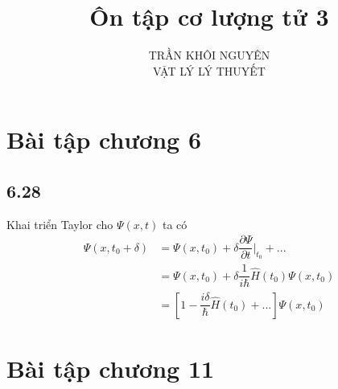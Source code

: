 \documentclass{article}
\title{\Huge{Ôn tập cơ lượng tử 3}}
\newcommand{\f}[2]{\dfrac{#1}{#2}}
\newcommand{\at}[2]{\bigg\rvert_{#1}^{#2} }
\begin{document}
\setlength{\parindent}{20pt}
\newpage
\author{TRẦN KHÔI NGUYÊN \\ VẬT LÝ LÝ THUYẾT}
\maketitle
\section{Bài tập chương 6}	
\subsection*{6.28}
Khai triển Taylor cho $\Psi(x,t)$ ta có
\begin{equation*}
	\begin{aligned}
		\Psi(x,t_{0} + \delta) 
		&= \Psi(x,t_{0}) + \delta \f{\partial \Psi}{\partial t} \at{t_{0}}{} + ... \\
		&= \Psi(x, t_{0}) + \delta \f{1}{i \hbar} \hat{H}(t_{0}) \Psi(x,t_{0})\\
		&= \left[ 1 - \f{i \delta}{\hbar} \hat{H}(t_{0}) + ... \right] \Psi(x,t_{0})
	\end{aligned}
\end{equation*}	
\section{Bài tập chương 11}
\end{document}
